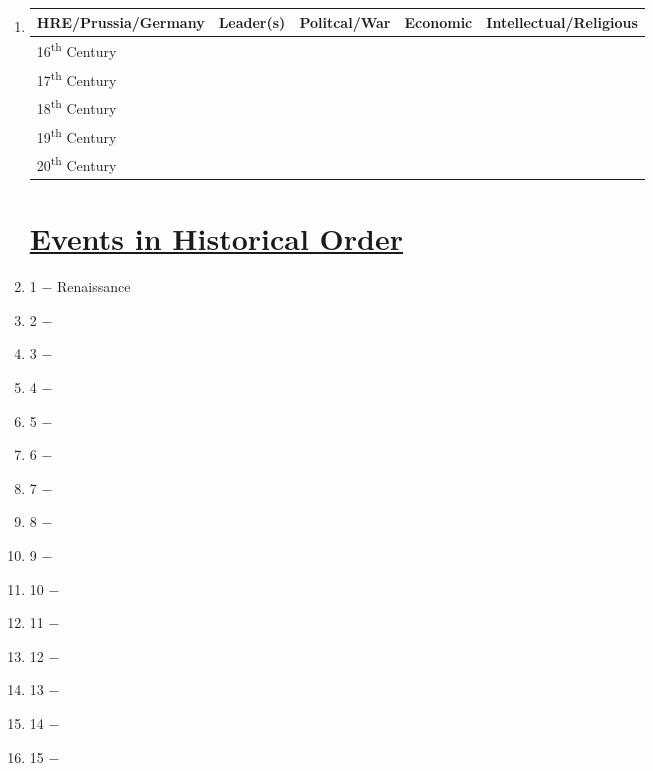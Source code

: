 \documentclass[12pt]{article}
\begin{document}
\begin{enumerate}
\begin{tabular}{l c c c c}
\end{tabular}

\item \begin{tabular}{l c c c c}

HRE/Prussia/Germany & Leader(s) & Politcal/War & Economic & Intellectual/Religious \\
\hline
16\textsuperscript{th} Century & & & & \\
\hline
17\textsuperscript{th} Century & & & & \\
\hline
18\textsuperscript{th} Century & & & & \\
\hline
19\textsuperscript{th} Century & & & & \\
\hline
20\textsuperscript{th} Century & & & & \\

\end{tabular}

\section{\underline{Events in Historical Order}}

\item 1 $-$ Renaissance

\item 2 $-$ 

\item 3 $-$ 

\item 4 $-$ 

\item 5 $-$ 

\item 6 $-$ 

\item 7 $-$ 

\item 8 $-$ 

\item 9 $-$ 

\item 10 $-$ 

\item 11 $-$ 

\item 12 $-$ 

\item 13 $-$ 

\item 14 $-$ 

\item 15 $-$


\end{enumerate}
\end{document}
